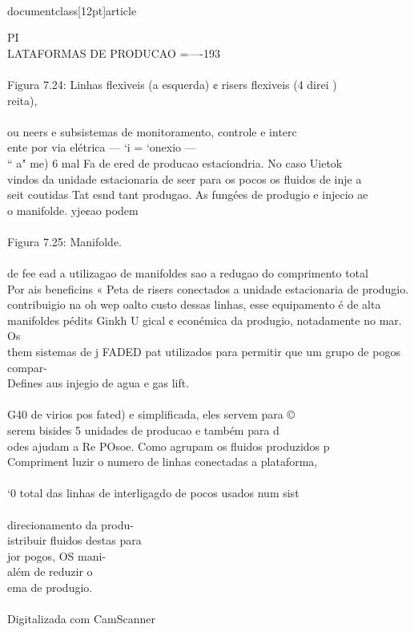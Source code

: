 \\documentclass[12pt]{article}
\begin{document}
PI\\
LATAFORMAS DE PRODUCAO =—-193\\
\\
Figura 7.24: Linhas flexiveis (a esquerda) ¢ risers flexiveis (4 direi )\\
reita),\\
\\
ou neers e subsistemas de monitoramento, controle e interc\\
ente por via elétrica — ‘i = ‘onexio —\\
“ a" me) 6 mal Fa de ered de producao estaciondria. No caso Uietok\\
vindos da unidade estacionaria de seer para os pocos os fluidos de inje a\\
seit coutidas Tat esnd tant produgao. As fungées de produgio e injecio ae\\
o manifolde. yje¢ao podem\\
\\
Figura 7.25: Manifolde.\\
\\
de fee ead a utilizagao de manifoldes sao a redugao do comprimento total\\
Por ais beneficins « Peta de risers conectados a unidade estacionaria de produgio.\\
contribuigio na oh wep oalto custo dessas linhas, esse equipamento é de alta\\
manifoldes pédits Ginkh U gical ¢ econémica da produgio, notadamente no mar. Os\\
them sistemas de j FADED pat utilizados para permitir que um grupo de pogos compar-\\
Defines aus injegio de agua e gas lift.\\
\\
G40 de virios pos fated) e simplificada, eles servem para ©\\
serem bisides 5 unidades de producao e também para d\\
odes ajudam a Re POsoe. Como agrupam os fluidos produzidos p\\
Compriment luzir o numero de linhas conectadas a plataforma,\\
\\
‘0 total das linhas de interligagdo de pocos usados num sist\\
\\
direcionamento da produ-\\
istribuir fluidos destas para\\
jor pogos, OS mani-\\
além de reduzir o\\
ema de produgio.\\
\\
Digitalizada com CamScanner\\
\end{document}
